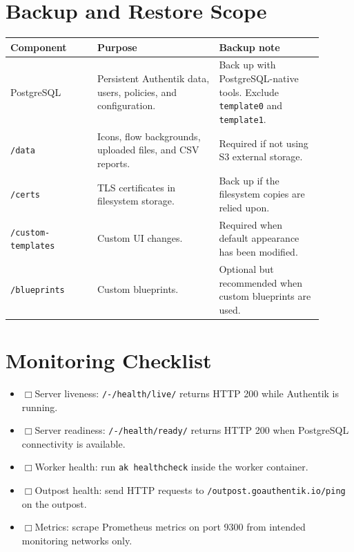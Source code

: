 \documentclass[11pt]{article}
\newcommand{\checkbox}{$\Box$\hspace{0.4em}}
\begin{document}
\section*{Backup and Restore Scope}
\begin{longtable}{>{\raggedright\arraybackslash}p{0.25\linewidth}>{\raggedright\arraybackslash}p{0.35\linewidth}>{\raggedright\arraybackslash}p{0.30\linewidth}}
\textbf{Component} & \textbf{Purpose} & \textbf{Backup note} \\
\hline
PostgreSQL & Persistent Authentik data, users, policies, and configuration. & Back up with PostgreSQL-native tools. Exclude \texttt{template0} and \texttt{template1}. \\
\texttt{/data} & Icons, flow backgrounds, uploaded files, and CSV reports. & Required if not using S3 external storage. \\
\texttt{/certs} & TLS certificates in filesystem storage. & Back up if the filesystem copies are relied upon. \\
\texttt{/custom-templates} & Custom UI changes. & Required when default appearance has been modified. \\
\texttt{/blueprints} & Custom blueprints. & Optional but recommended when custom blueprints are used. \\
\end{longtable}

\section*{Monitoring Checklist}
\begin{itemize}
\item \checkbox Server liveness: \texttt{/-/health/live/} returns HTTP 200 while Authentik is running.
\item \checkbox Server readiness: \texttt{/-/health/ready/} returns HTTP 200 when PostgreSQL connectivity is available.
\item \checkbox Worker health: run \texttt{ak healthcheck} inside the worker container.
\item \checkbox Outpost health: send HTTP requests to \texttt{/outpost.goauthentik.io/ping} on the outpost.
\item \checkbox Metrics: scrape Prometheus metrics on port 9300 from intended monitoring networks only.
\end{itemize}
\end{document}
